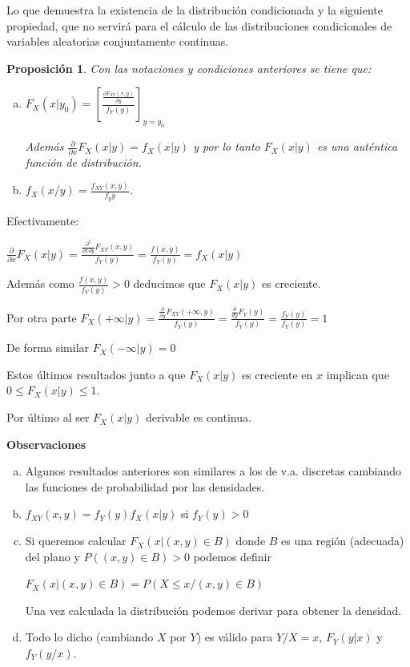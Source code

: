 \documentclass[12pt]{report}
\newtheorem{proposition}[definition]{Proposici\'on}
\begin{document}
    Lo que demuestra la existencia de la distribución condicionada
    y la siguiente propiedad, que no servirá para el  cálculo de las distribuciones
    condicionales de variables aleatorias conjuntamente continuas.

   \begin{proposition}
   Con las notaciones y condiciones  anteriores se tiene que: 

   \begin{enumerate}[a)]
   \item $F_{X}(x|y_0)=\left[\frac{\frac{\partial F_{XY}(x,y)}{\partial y}}{f_{Y}(y)}\right]_{y=y_0}$

Además  $\frac{\partial}{\partial x} F_{X}(x|y)=f_{X}(x|y)$ y por lo tanto   $F_{X}(x|y)$
es una auténtica función de distribución.
 \item $f_X(x/y)=\frac{f_{X Y}(x,y)}{f_y{y}}$.
\end{enumerate}
 \end{proposition}
 Efectivamente:

$\frac{\partial}{\partial x} F_{X}(x|y)=\frac{\frac{\partial^2}{\partial x\partial
y}F_{XY}(x,y)}{f_{Y}(y)}=\frac{f(x,y)}{f_{Y}(y)}=f_{X}(x|y)$

Además como $\frac{f(x,y)}{f_{Y}(y)}>0$ deducimos que $F_{X}(x|y)$ es creciente.

Por otra parte $F_{X}(+\infty|y)=\frac{\frac{\partial}{\partial
y}F_{XY}(+\infty,y)}{f_{Y}(y)}=\frac{\frac{d}{d
y}F_{Y}(y)}{f_{Y}(y)}=\frac{f_{Y}(y)}{f_{Y}(y)}=1$

De forma similar $F_{X}(-\infty|y)=0$

Estos últimos resultados junto a que $F_{X}(x|y)$ es creciente en $x$ implican que $0\leq
F_{X}(x|y)\leq 1$.

Por último al ser $F_{X}(x|y)$ derivable es continua.



    \textbf{Observaciones}

    \begin{enumerate}[a)]
    \item Algunos resultados anteriores son  similares a los de v.a.
    discretas cambiando las funciones de probabilidad por las densidades.
    \item $f_{XY}(x,y)=f_{Y}(y) f_{X}(x|y)$ si $f_{Y}(y)>0$
    \item Si queremos calcular $F_{X}(x|(x,y)\in B)$ donde $B$ es una
    región (adecuada) del plano y $P((x,y)\in B)>0$ podemos definir

    $F_{X}(x|(x,y)\in B)=P(X\leq x/(x,y)\in B)$

    Una vez calculada la distribución podemos derivar para obtener la
    densidad.
    \item Todo lo dicho (cambiando $X$ por $Y$) es válido para $Y/X=x$,
    $F_{Y}(y|x)$ y $f_{Y}(y/x)$.
    \end{enumerate}
\end{document}
